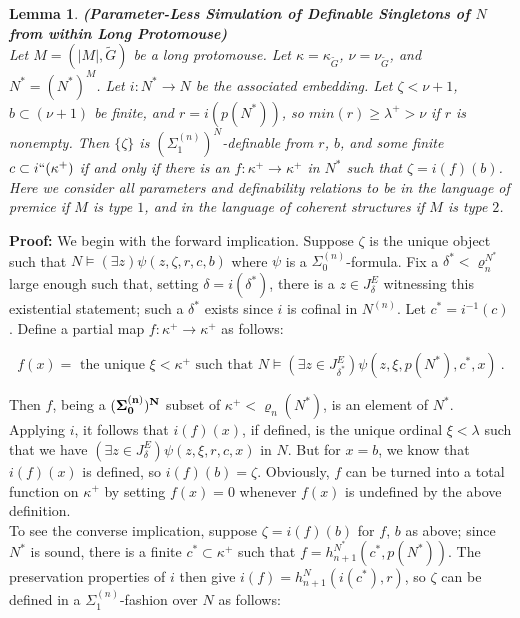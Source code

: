 \documentclass[12pt]{article}
\newtheorem{lem}[thm]{Lemma}
\begin{document}
\begin{lem} \label{long translation1}
\textbf{(Parameter-Less Simulation of Definable Singletons of $N$ from within Long Protomouse)}\\

Let $M = (|M| , \tilde{G})$ be a long protomouse.  Let $\kappa = \kappa_{\tilde{G}}$, $ \nu = \nu_{\tilde{G}}$, and $N^* = (N^*)^M$.  Let $i: N^* \longrightarrow  N$ be the associated embedding.  Let $\zeta < \nu + 1$, $b \subset (\nu + 1 )$ be finite, and $r =  i (p (N^* ))$, so $min(r) \geq \lambda^+ > \nu$ if $r$ is nonempty.  Then $\{ \zeta \}$ is $(\Sigma_1^{(n)})^N$-definable from $r$, $b$, and some finite $c \subset i`` (\kappa^+)$ if and only if there is an $f: \kappa^+ \longrightarrow \kappa^+$ in $N^*$ such that $\zeta = i (f)(b)$.\\


Here we consider all parameters and definability relations to be in the language of premice if $M$ is type $1$, and in the language of coherent structures if $M$ is type $2$.
\end{lem}

\textbf{Proof:} We begin with the forward implication.  Suppose $\zeta$ is the unique object such that $N \models (\exists z) \psi ( z , \zeta , r , c, b )$ where $\psi$ is a $\Sigma_0^{(n)}$-formula.  Fix a $\delta^* < \varrho_n^{N^*}$ large enough such that, setting $\delta = i(\delta^* )$, there is a $z \in J_\delta^E$ witnessing this existential statement; such a $\delta^*$ exists since $i$ is cofinal in $N^{(n)}$.  Let $c^* = i^{-1}(c)$.  Define a partial map $f: \kappa^+ \longrightarrow \kappa^+$ as follows:

\[
f(x) = \text{ the unique } \xi < \kappa^+ \text{ such that } N \models (\exists z \in J_{\delta^*}^E ) \psi (z , \xi , p (N^* ) , c^* ,  x ) \ .
\]

Then $f$, being a $(\bf{\Sigma}_0^{(n)})^N$ subset of $\kappa^+ < \varrho_n (N^* )$, is an element of $N^*$.  Applying $i$, it follows that $i (f)(x)$, if defined, is the unique ordinal $\xi < \lambda$ such that we have $(\exists z \in J_\delta^E) \psi (z, \xi , r , c, x  )$ in $N$.  But for $x = b$, we know that $i (f) (x)$ is defined, so $i (f)(b) = \zeta$.  Obviously, $f$ can be turned into a total function on $\kappa^+$ by setting $f(x) = 0$ whenever $f(x)$ is undefined by the above definition.\\

To see the converse implication, suppose $\zeta = i (f)(b)$ for $f$, $b$ as above; since $N^*$ is sound, there is a finite $c^* \subset \kappa^+$ such that $f = h_{n+1}^{N^*} ( c^* , p (N^*))$.  The preservation properties of $i$ then give $i(f) = h_{n+1}^N ( i( c^* ) , r)$, so $\zeta$ can be defined in a $\Sigma_1^{(n)}$-fashion over $N$ as follows:
\end{document}
